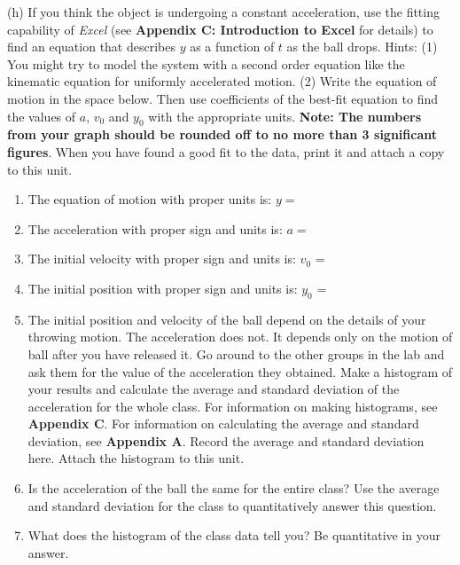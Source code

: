(h) If you think the object is undergoing a constant acceleration, use the fitting capability of \textit{Excel} (see \textbf{Appendix C: Introduction to
Excel} for details) to find an equation that describes $y$ as a function
of $t$ as the ball drops. Hints: (1) You might try to model the system with a
second order equation like the kinematic equation for uniformly accelerated
motion. (2) Write the equation of motion in the space below. Then use coefficients of the best-fit equation to find the values of $a$, \( v_{0} \) and \( y_{0} \) with the appropriate units. \textbf{Note: The numbers from your graph should be rounded off to no more than 3 significant figures}. When you have found a good fit to the data, print it and attach a copy to this unit. 

\begin{enumerate}
\item The equation of motion with proper units is: $y =$\vspace{5mm}

\item The acceleration with proper sign and units is: $a =$ \vspace{5mm}

\item The initial velocity with proper sign and units is: \(v_{0} \) = \vspace{5mm}

\item The initial position with proper sign and units is: \(y_{0} \) = \vspace{5mm}

\item The initial position and velocity of the ball depend on the details of your throwing motion. 
The acceleration does not.
It depends only on the motion of ball after you have released it.
Go around to the other groups in the lab and ask them for the value of the acceleration they obtained.
Make a histogram of your results and calculate the average and standard deviation of the acceleration for the whole class.
For information on making histograms, see \textbf{Appendix C}. For information on calculating the average and
standard deviation, see \textbf{Appendix A}. Record the average and standard deviation here.
Attach the histogram to this unit.
\vspace{20mm}

\item Is the acceleration of the ball the same for the entire class? Use the average and standard deviation for the class to quantitatively answer this question.
\vspace{20mm}

\item What does the histogram of the class data tell you? Be quantitative in your answer.
\vspace{20mm}

\end{enumerate}
